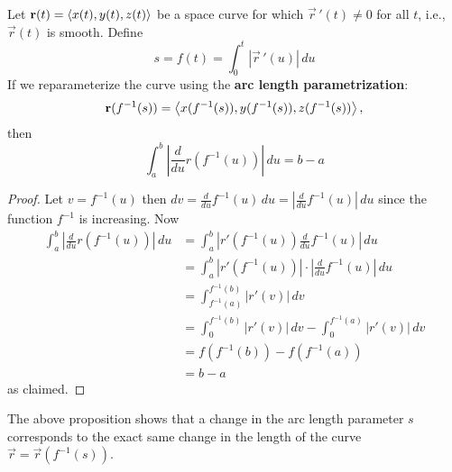 \documentclass[handout]{ximera}
\begin{document}
\begin{proposition}
Let  $\mathbf r(t) = \left\langle x(t), y(t), z(t)\right\rangle $ be a space curve for which $\vec r\,'(t) \neq 0$ for all $t$, i.e., $\vec r(t)$ is smooth.
Define
\[
s = f(t) = \int_0^t |\vec r\,'(u)|\, du
\]
If we reparameterize the curve using the \textbf{arc length parametrization}:
\[
\mathbf r(f^{-1}(s)) = \left\langle x(f^{-1}(s)), y(f^{-1}(s)), z(f^{-1}(s))\right\rangle,
\]
then
\[
\int_a^b \left|\frac{d}{du} r(f^{-1} (u))\right| \, du = b-a
\]
\end{proposition}
\begin{proof}
Let $v = f^{-1}(u)$ then $dv = \frac{d}{du}f^{-1}(u) \, du = \left|\frac{d}{du}f^{-1}(u)\right| \, du$ since the function $f^{-1}$ is increasing.
Now
\begin{align*}
\int_a^b \left|\frac{d}{du} r(f^{-1} (u))\right| \, du &= \int_a^b \left| r'(f^{-1} (u))\frac{d}{du}f^{-1} (u)\right| \, du\\
&= \int_a^b | r'(f^{-1} (u))| \cdot \left|\frac{d}{du}f^{-1} (u)\right| \, du\\
&= \int_{f^{-1}(a)}^{f^{-1}(b)} | r'(v)| \, dv\\
&= \int_0^{f^{-1}(b)} | r'(v)| \, dv - \int_0^{f^{-1}(a)} | r'(v)| \, dv\\
&= f(f^{-1}(b)) - f(f^{-1}(a))\\
&= b -a
\end{align*}
as claimed.
\end{proof}

\begin{remark}
The above proposition shows that a change in the arc length parameter $s$ corresponds to the exact same change in the length of the curve $\vec r = \vec r(f^{-1}(s))$.
\end{remark}
\end{document}
